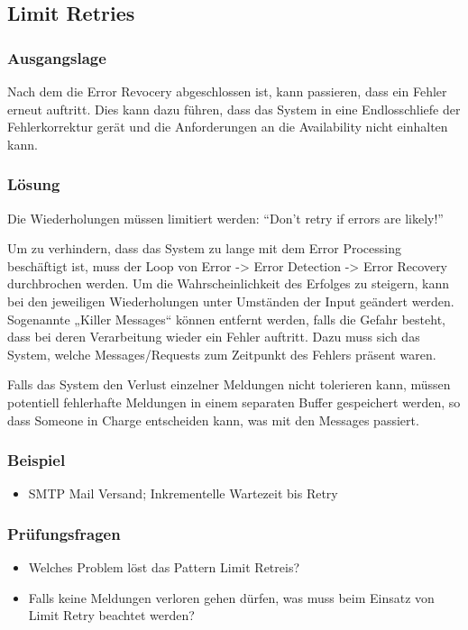 \subsection{Limit Retries}


\subsubsection*{Ausgangslage}


Nach dem die Error Revocery abgeschlossen ist, kann passieren, dass ein Fehler erneut auftritt. Dies kann dazu führen, dass das System in eine Endlosschliefe der Fehlerkorrektur gerät und die Anforderungen an die Availability nicht einhalten kann.

\subsubsection*{Lösung}


Die Wiederholungen müssen limitiert werden: ``Don’t retry if errors are likely!''

Um zu verhindern, dass das System zu lange mit dem Error Processing beschäftigt ist, muss der Loop von Error -> Error Detection -> Error Recovery durchbrochen werden. Um die Wahrscheinlichkeit des Erfolges zu steigern, kann bei den jeweiligen Wiederholungen unter Umständen der Input geändert werden. Sogenannte „Killer Messages“ können entfernt werden, falls die Gefahr besteht, dass bei deren Verarbeitung wieder ein Fehler auftritt. Dazu muss sich das System, welche Messages/Requests zum Zeitpunkt des Fehlers präsent waren.

Falls das System den Verlust einzelner Meldungen nicht tolerieren kann, müssen potentiell fehlerhafte Meldungen in einem separaten Buffer gespeichert werden, so dass Someone in Charge entscheiden kann, was mit den Messages passiert.


\subsubsection*{Beispiel}


\begin{itemize}
	\item SMTP Mail Versand; Inkrementelle Wartezeit bis Retry
\end{itemize}

\subsubsection*{Prüfungsfragen}

\begin{itemize}
	\item Welches Problem löst das Pattern Limit Retreis?
	\item Falls keine Meldungen verloren gehen dürfen, was muss beim Einsatz von Limit Retry beachtet werden?
\end{itemize}

